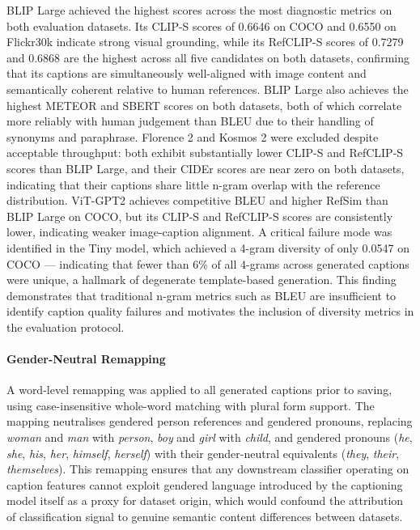 BLIP Large achieved the highest scores across the most diagnostic metrics 
on both evaluation datasets. Its CLIP-S scores of 0.6646 on COCO and 
0.6550 on Flickr30k indicate strong visual grounding, while its RefCLIP-S 
scores of 0.7279 and 0.6868 are the highest across all five candidates on 
both datasets, confirming that its captions are simultaneously well-aligned 
with image content and semantically coherent relative to human references. 
BLIP Large also achieves the highest METEOR and SBERT scores on both 
datasets, both of which correlate more reliably with human judgement than 
BLEU due to their handling of synonyms and paraphrase. Florence 2 and 
Kosmos 2 were excluded despite acceptable throughput: both exhibit 
substantially lower CLIP-S and RefCLIP-S scores than BLIP Large, and 
their CIDEr scores are near zero on both datasets, indicating that their 
captions share little n-gram overlap with the reference distribution. 
ViT-GPT2 achieves competitive BLEU and higher RefSim than BLIP Large on 
COCO, but its CLIP-S and RefCLIP-S scores are consistently lower, 
indicating weaker image-caption alignment. A critical failure mode was 
identified in the Tiny model, which achieved a 4-gram diversity of only 
0.0547 on COCO — indicating that fewer than 6\% of all 4-grams across 
generated captions were unique, a hallmark of degenerate template-based 
generation. This finding demonstrates that traditional n-gram metrics such 
as BLEU are insufficient to identify caption quality failures and motivates 
the inclusion of diversity metrics in the evaluation protocol.

\paragraph{Gender-Neutral Remapping}
A word-level remapping was applied to all generated captions prior to 
saving, using case-insensitive whole-word matching with plural form 
support. The mapping neutralises gendered person references and gendered 
pronouns, replacing \textit{woman} and \textit{man} with \textit{person}, 
\textit{boy} and \textit{girl} with \textit{child}, and gendered pronouns 
(\textit{he}, \textit{she}, \textit{his}, \textit{her}, \textit{himself}, 
\textit{herself}) with their gender-neutral equivalents (\textit{they}, 
\textit{their}, \textit{themselves}). This remapping ensures that any 
downstream classifier operating on caption features cannot exploit gendered 
language introduced by the captioning model itself as a proxy for dataset 
origin, which would confound the attribution of classification signal to 
genuine semantic content differences between datasets.


